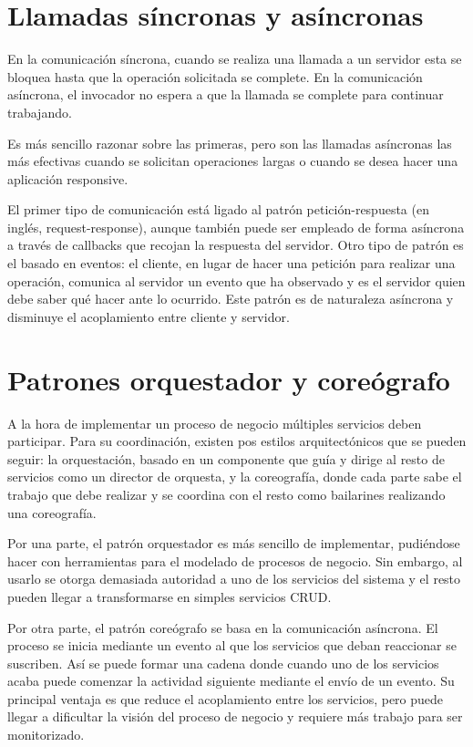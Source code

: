 \documentclass[11pt,a4paper]{article}
\begin{document}
\section{Llamadas síncronas y asíncronas}

En la comunicación síncrona, cuando se realiza una llamada a un servidor esta se bloquea hasta que la operación solicitada se complete. En la comunicación asíncrona, el invocador no espera a que la llamada se complete para continuar trabajando.

Es más sencillo razonar sobre las primeras, pero son las llamadas asíncronas las más efectivas cuando se solicitan operaciones largas o cuando se desea hacer una aplicación responsive.

El primer tipo de comunicación está ligado al patrón petición-respuesta (en inglés, request-response), aunque también puede ser empleado de forma asíncrona a través de callbacks que recojan la respuesta del servidor. Otro tipo de patrón es el basado en eventos: el cliente, en lugar de hacer una petición para realizar una operación, comunica al servidor un evento que ha observado y es el servidor quien debe saber qué hacer ante lo ocurrido. Este patrón es de naturaleza asíncrona y disminuye el acoplamiento entre cliente y servidor.

\section{Patrones orquestador y coreógrafo}

A la hora de implementar un proceso de negocio múltiples servicios deben participar. Para su coordinación, existen pos estilos arquitectónicos que se pueden seguir: la orquestación, basado en un componente que guía y dirige al resto de servicios como un director de orquesta, y la coreografía, donde cada parte sabe el trabajo que debe realizar y se coordina con el resto como bailarines realizando una coreografía.

Por una parte, el patrón orquestador es más sencillo de implementar, pudiéndose hacer con herramientas para el modelado de procesos de negocio. Sin embargo, al usarlo se otorga demasiada autoridad a uno de los servicios del sistema y el resto pueden llegar a transformarse en simples servicios CRUD.

Por otra parte, el patrón coreógrafo se basa en la comunicación asíncrona. El proceso se inicia mediante un evento al que los servicios que deban reaccionar se suscriben. Así se puede formar una cadena donde cuando uno de los servicios acaba puede comenzar la actividad siguiente mediante el envío de un evento. Su principal ventaja es que reduce el acoplamiento entre los servicios, pero puede llegar a dificultar la visión del proceso de negocio y requiere más trabajo para ser monitorizado.
\end{document}
